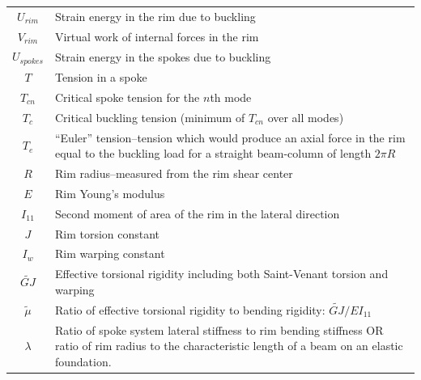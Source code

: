 \documentclass{bmd2016p}
\begin{document}
\begin{tabular}{c|p{12cm}}
$U_{rim}$	& Strain energy in the rim due to buckling\\
$V_{rim}$	& Virtual work of internal forces in the rim\\
$U_{spokes}$& Strain energy in the spokes due to buckling\\
$T$			& Tension in a spoke\\
$T_{cn}$	& Critical spoke tension for the $n$th mode\\
$T_c$		& Critical buckling tension (minimum of $T_{cn}$ over all modes)\\
$T_e$		& ``Euler'' tension--tension which would produce an axial force in the rim
			  equal to the buckling load for a straight beam-column of length $2\pi R$\\
$R$			& Rim radius--measured from the rim shear center\\
$E$			& Rim Young's modulus\\
$I_{11}$	& Second moment of area of the rim in the lateral direction\\
$J$			& Rim torsion constant\\
$I_w$		& Rim warping constant\\
$\widetilde{GJ}$ & Effective torsional rigidity including both Saint-Venant torsion and warping\\
$\tilde{\mu}$ & Ratio of effective torsional rigidity to bending rigidity: $\widetilde{GJ}/EI_{11}$\\
$\lambda$	& Ratio of spoke system lateral stiffness to rim bending stiffness OR ratio
			  of rim radius to the characteristic length of a beam on an elastic foundation.\\
\hline
\end{tabular}
\end{document}
